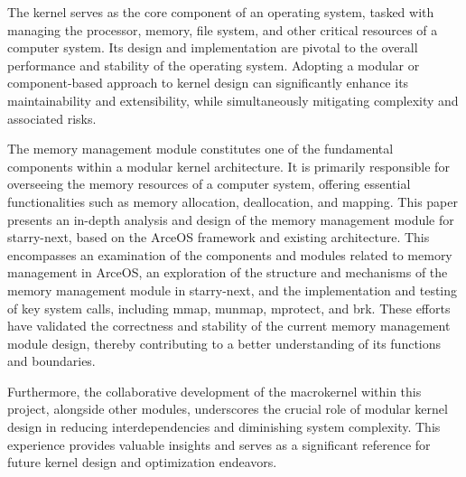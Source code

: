 \begin{abstract*}
  The kernel serves as the core component of an operating system, 
  tasked with managing the processor, memory, file system, 
  and other critical resources of a computer system. 
  Its design and implementation are pivotal to the overall performance and stability of the operating system. 
  Adopting a modular or component-based approach to kernel design can significantly enhance its maintainability and extensibility, 
  while simultaneously mitigating complexity and associated risks.

  The memory management module constitutes one of the fundamental components within a modular kernel architecture. It is primarily responsible for overseeing the memory resources of a computer system, offering essential functionalities such as memory allocation, deallocation, and mapping. This paper presents an in-depth analysis and design of the memory management module for starry-next, based on the ArceOS framework and existing architecture. This encompasses an examination of the components and modules related to memory management in ArceOS, an exploration of the structure and mechanisms of the memory management module in starry-next, and the implementation and testing of key system calls, including mmap, munmap, mprotect, and brk. These efforts have validated the correctness and stability of the current memory management module design, 
  thereby contributing to a better understanding of its functions and boundaries.

  Furthermore, the collaborative development of the macrokernel within this project, alongside other modules, underscores the crucial role of modular kernel design in reducing interdependencies and diminishing system complexity. This experience provides valuable insights and serves as a significant reference for future kernel design and optimization endeavors.
\end{abstract*}